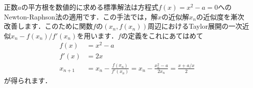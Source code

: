 正数$a$の平方根を数値的に求める標準解法は方程式$f(x) = x^2 - a = 0$へのNewton-Raphson法の適用です．この手法では，解$x$の近似解$x_n$の近似度を漸次改善します．このために関数$f$の$(x_n, f(x_n))$周辺におけるTaylor展開の一次近似$x_n - f(x_n) / f'(x_n)$を用います．$f$の定義をこれにあてはめて
\begin{align*}
f(x)    &= x^2 - a \\
f'(x)   &= 2x \\
x_{n+1} &= x_n - \frac {f(x_n)}{f'(x_n)}
         = x_n - \frac {x_n^2 - a} {2x_n}
         = \frac {x + a / x} 2
\end{align*}
が得られます．
